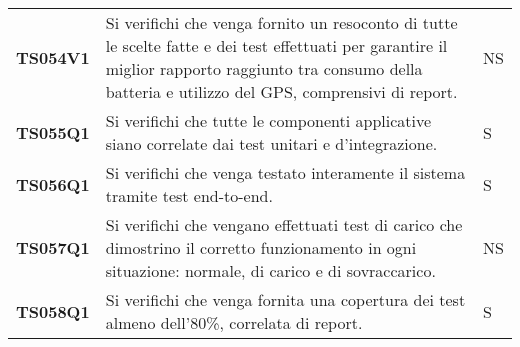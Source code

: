\documentclass[../piano-di-qualifica.tex]{subfiles}
\begin{document}
\begin{longtable}[H]{>{\centering\bfseries}m{3cm} >{}m{10cm} >{\centering\arraybackslash}m{3cm}}
  TS054V1            & Si verifichi che venga fornito un resoconto di tutte le scelte fatte e dei test effettuati per garantire il miglior rapporto raggiunto tra consumo della batteria e utilizzo del GPS, comprensivi di report.
                     & NS \\

  TS055Q1            & Si verifichi che tutte le componenti applicative siano correlate dai test unitari e d'integrazione.
                     & S                                                                                                                                                                                                                                                               \\

  TS056Q1            & Si verifichi che venga testato interamente il sistema tramite test end-to-end.
                     & S                                                                                                                                                                                                                                                               \\

  TS057Q1            & Si verifichi che vengano effettuati test di carico che dimostrino il corretto funzionamento in ogni situazione: normale, di carico e di sovraccarico.
                     & NS                                                                                                                                                                                                                                                               \\

  TS058Q1            & Si verifichi che venga fornita una copertura dei test almeno dell'80\%, correlata di report.
                     & S                                                                                                                                                                                                                                                               \\                                                                                                                                                                                                                                                       



\end{longtable}
\end{document}
